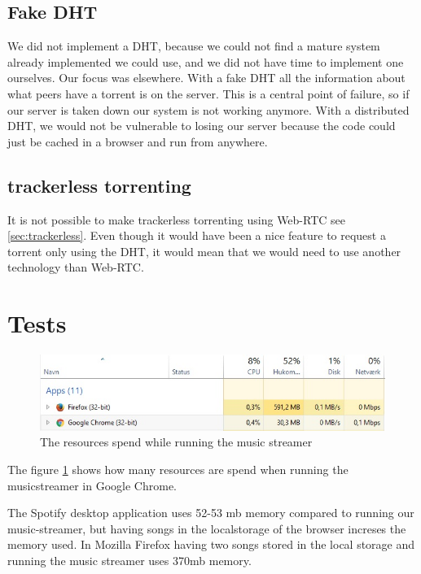 \subsection{Fake \acs{DHT}}
We did not implement a DHT, because we could not find a mature system already implemented we could use, and we did not have time to implement one ourselves.
Our focus was elsewhere.
With a fake \acs{DHT} all the information about what peers have a torrent is on the server. This is a central point of failure, so if our server is taken down our system is not working anymore.
With a distributed \acs{DHT}, we would not be vulnerable to losing our server because the code could just be cached in a browser and run from anywhere.
\subsection{trackerless torrenting}
It is not possible to make trackerless torrenting using Web-RTC see \ref{sec:trackerless}. Even though it would have been a nice feature to request a torrent only using the \acs{DHT}, it would mean that we would need to use another technology than Web-RTC. 

\section{Tests}
\begin{figure}[H]
	\centering
	\includegraphics[scale=0.4]{gfx/streamerIdle}
	\caption{The resources spend while running the music streamer}
	\label{fig:streamer-idle}
\end{figure}
The figure \ref{fig:streamer-idle} shows how many resources are spend when running the musicstreamer in Google Chrome.

The Spotify desktop application uses 52-53 mb memory compared to running our music-streamer, but having songs in the localstorage of the browser increses the memory used. In Mozilla Firefox having two songs stored in the local storage and running the music streamer uses 370mb memory.

